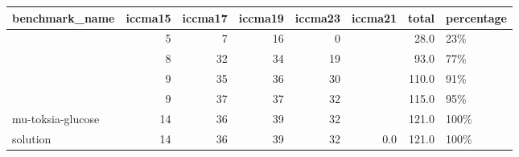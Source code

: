 \begin{tabular}{lrrrrrr}
\toprule
benchmark\_name &  iccma15 &  iccma17 &  iccma19 &  iccma23 & iccma21 &  total & percentage \\
\midrule
{}            &        5 &        7 &       16 &        0 &         &   28.0 &        23\% \\
            &        8 &       32 &       34 &       19 &         &   93.0 &        77\% \\
            &        9 &       35 &       36 &       30 &         &  110.0 &        91\% \\
            &        9 &       37 &       37 &       32 &         &  115.0 &        95\% \\
mu-toksia-glucose &       14 &       36 &       39 &       32 &         &  121.0 &       100\% \\
\midrule
solution          &       14 &       36 &       39 &       32 &     0.0 &  121.0 &       100\% \\
\bottomrule
\end{tabular}
